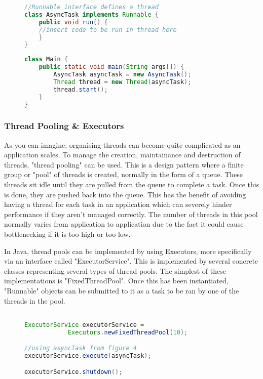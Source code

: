\documentclass[]{report}
\begin{document}
\begin{figure}[h!]
\caption{}
\begin{lstlisting}[language=Java,frame=single]
//Runnable interface defines a thread
class AsyncTask implements Runnable {
	public void run() {
	//insert code to be run in thread here
	}
}
\end{lstlisting}
\end{figure}

\newpage
\begin{figure}[h!]
\caption{}
\begin{lstlisting}[language=Java,frame=single]
class Main {
	public static void main(String args[]) { 
		AsyncTask asyncTask = new AsyncTask();
		Thread thread = new Thread(asyncTask);
		thread.start();
	}
}
\end{lstlisting}
\end{figure}

\subsubsection{Thread Pooling \& Executors}
As you can imagine, organising threads can become quite complicated as an application scales. To manage the creation, maintainance and destruction of threads, "thread pooling" can be used. This is a design pattern where a finite group or "pool" of threads is created, normally in the form of a queue. These threads sit idle until they are pulled from the queue to complete a task. Once this is done, they are pushed back into the queue. This has the benefit of avoiding having a thread for each task in an application which can severely hinder performance if they aren't managed correctly. The number of threads in this pool normally varies from application to application due to the fact it could cause bottlenecking if it is too high or too low.

In Java, thread pools can be implemented by using Executors, more specifically via an interface called "ExecutorService". This is implemented by several concrete classes representing several types of thread pools. The simplest of these implementations is "FixedThreadPool". Once this has been instantiated, "Runnable" objects can be submitted to it as a task to be ran by one of the threads in the pool.

\begin{figure}[h!]
\caption{}
\begin{lstlisting}[language=Java,frame=single]

ExecutorService executorService = 
			Executors.newFixedThreadPool(10);

//using asyncTask from figure 4
executorService.execute(asyncTask);

executorService.shutdown();
\end{lstlisting}
\end{figure}
\end{document}
